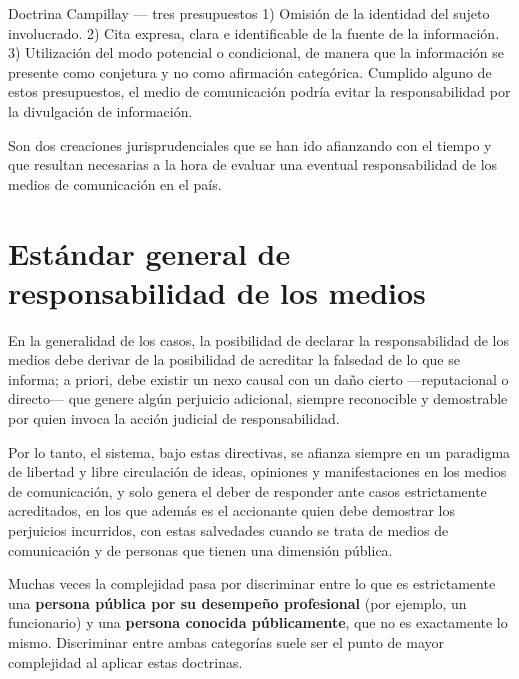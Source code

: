 \documentclass[12pt,oneside]{book}
\begin{document}
\begin{definition}{Doctrina Campillay --- tres presupuestos}
1) Omisión de la identidad del sujeto involucrado. 2) Cita expresa, clara e identificable de la fuente de la información. 3) Utilización del modo potencial o condicional, de manera que la información se presente como conjetura y no como afirmación categórica. Cumplido alguno de estos presupuestos, el medio de comunicación podría evitar la responsabilidad por la divulgación de información.
\end{definition}

Son dos creaciones jurisprudenciales que se han ido afianzando con el tiempo y que resultan necesarias a la hora de evaluar una eventual responsabilidad de los medios de comunicación en el país.

\section{Estándar general de responsabilidad de los medios}

En la generalidad de los casos, la posibilidad de declarar la responsabilidad de los medios debe derivar de la posibilidad de acreditar la falsedad de lo que se informa; a priori, debe existir un nexo causal con un daño cierto —reputacional o directo— que genere algún perjuicio adicional, siempre reconocible y demostrable por quien invoca la acción judicial de responsabilidad.

Por lo tanto, el sistema, bajo estas directivas, se afianza siempre en un paradigma de libertad y libre circulación de ideas, opiniones y manifestaciones en los medios de comunicación, y solo genera el deber de responder ante casos estrictamente acreditados, en los que además es el accionante quien debe demostrar los perjuicios incurridos, con estas salvedades cuando se trata de medios de comunicación y de personas que tienen una dimensión pública.

\begin{important}
Muchas veces la complejidad pasa por discriminar entre lo que es estrictamente una \textbf{persona pública por su desempeño profesional} (por ejemplo, un funcionario) y una \textbf{persona conocida públicamente}, que no es exactamente lo mismo. Discriminar entre ambas categorías suele ser el punto de mayor complejidad al aplicar estas doctrinas.
\end{important}
\end{document}

